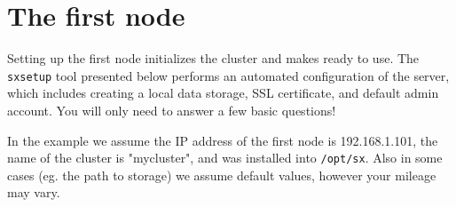 \section*{The first node}

Setting up the first node initializes the cluster and makes \SX ready to
use. The \verb+sxsetup+ tool presented below performs an automated
configuration of the \SX server, which includes creating a local
data storage, SSL certificate, and default admin account. You will only
need to answer a few basic questions!

In the example we assume the IP address of the first node is
192.168.1.101, the name of the cluster is "mycluster", and \SX was
installed into \verb+/opt/sx+. Also in some cases (eg. the path to
\SX storage) we assume default values, however your mileage may vary.\\

